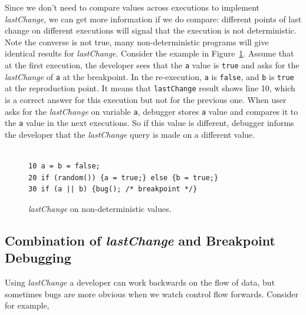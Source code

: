 \documentclass{sig-alternate}
\begin{document}
Since we don't need to compare values across executions to implement \textit{lastChange}, we can get more information if we do compare:
 different points of last change on different executions will signal that the execution is not deterministic. Note the converse is not true, many non-deterministic 
programs will give identical results for \textit{lastChange}.
Consider the example in Figure~\ref{fig:nondeterministic-values}. 
Assume that at the first execution, the developer sees that the \texttt{a} value is \texttt{true} and asks
for the \textit{lastChange} of \texttt{a} at the breakpoint. In the re-execution, \texttt{a} is \texttt{false},
and \texttt{b} is \texttt{true} at the reproduction point. It means that \texttt{lastChange}
result shows line 10, which is a correct answer for this execution but not for the previous one.
When user asks for the \textit{lastChange} on variable \texttt{a}, debugger stores \texttt{a} value and compares
it to the \texttt{a} value in the next executions. So if this value is different, debugger informs the developer
that the \textit{lastChange} query is made on a different value.

\begin{figure}[htp]
\lstset{basicstyle=\scriptsize}
\begin{lstlisting}[frame=single, language=myLang]%, framerule=0pt]

10 a = b = false;
20 if (random()) {a = true;} else {b = true;}
30 if (a || b) {bug(); /* breakpoint */}
\end{lstlisting}
\caption{\textit{lastChange} on non-deterministic values.}
\label{fig:nondeterministic-values}
\end{figure}

\subsection{Combination of {\large\bf\textit{lastChange}} and Breakpoint Debugging}
\label{sec:pausing}
Using \textit{lastChange} a developer can work backwards on the flow of data, but sometimes bugs are more obvious when
we watch control flow forwards. Consider for example, 
\end{document}
